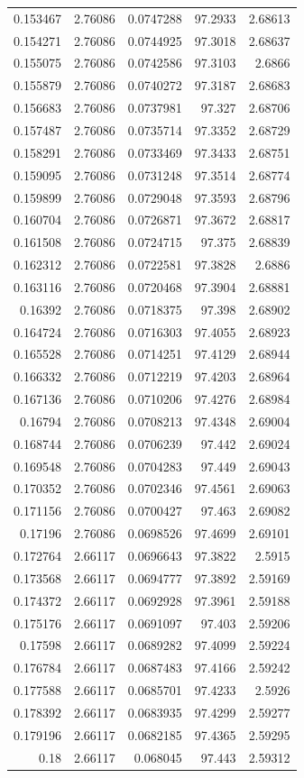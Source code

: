 \begin{tabular}{rrrrr}
 0.153467 & 2.76086 & 0.0747288 &  97.2933 & 2.68613 \\
 0.154271 & 2.76086 & 0.0744925 &  97.3018 & 2.68637 \\
 0.155075 & 2.76086 & 0.0742586 &  97.3103 &  2.6866 \\
 0.155879 & 2.76086 & 0.0740272 &  97.3187 & 2.68683 \\
 0.156683 & 2.76086 & 0.0737981 &   97.327 & 2.68706 \\
 0.157487 & 2.76086 & 0.0735714 &  97.3352 & 2.68729 \\
 0.158291 & 2.76086 & 0.0733469 &  97.3433 & 2.68751 \\
 0.159095 & 2.76086 & 0.0731248 &  97.3514 & 2.68774 \\
 0.159899 & 2.76086 & 0.0729048 &  97.3593 & 2.68796 \\
 0.160704 & 2.76086 & 0.0726871 &  97.3672 & 2.68817 \\
 0.161508 & 2.76086 & 0.0724715 &   97.375 & 2.68839 \\
 0.162312 & 2.76086 & 0.0722581 &  97.3828 &  2.6886 \\
 0.163116 & 2.76086 & 0.0720468 &  97.3904 & 2.68881 \\
  0.16392 & 2.76086 & 0.0718375 &   97.398 & 2.68902 \\
 0.164724 & 2.76086 & 0.0716303 &  97.4055 & 2.68923 \\
 0.165528 & 2.76086 & 0.0714251 &  97.4129 & 2.68944 \\
 0.166332 & 2.76086 & 0.0712219 &  97.4203 & 2.68964 \\
 0.167136 & 2.76086 & 0.0710206 &  97.4276 & 2.68984 \\
  0.16794 & 2.76086 & 0.0708213 &  97.4348 & 2.69004 \\
 0.168744 & 2.76086 & 0.0706239 &   97.442 & 2.69024 \\
 0.169548 & 2.76086 & 0.0704283 &   97.449 & 2.69043 \\
 0.170352 & 2.76086 & 0.0702346 &  97.4561 & 2.69063 \\
 0.171156 & 2.76086 & 0.0700427 &   97.463 & 2.69082 \\
  0.17196 & 2.76086 & 0.0698526 &  97.4699 & 2.69101 \\
 0.172764 & 2.66117 & 0.0696643 &  97.3822 &  2.5915 \\
 0.173568 & 2.66117 & 0.0694777 &  97.3892 & 2.59169 \\
 0.174372 & 2.66117 & 0.0692928 &  97.3961 & 2.59188 \\
 0.175176 & 2.66117 & 0.0691097 &   97.403 & 2.59206 \\
  0.17598 & 2.66117 & 0.0689282 &  97.4099 & 2.59224 \\
 0.176784 & 2.66117 & 0.0687483 &  97.4166 & 2.59242 \\
 0.177588 & 2.66117 & 0.0685701 &  97.4233 &  2.5926 \\
 0.178392 & 2.66117 & 0.0683935 &  97.4299 & 2.59277 \\
 0.179196 & 2.66117 & 0.0682185 &  97.4365 & 2.59295 \\
     0.18 & 2.66117 &  0.068045 &   97.443 & 2.59312 \\
\bottomrule
\end{tabular}
